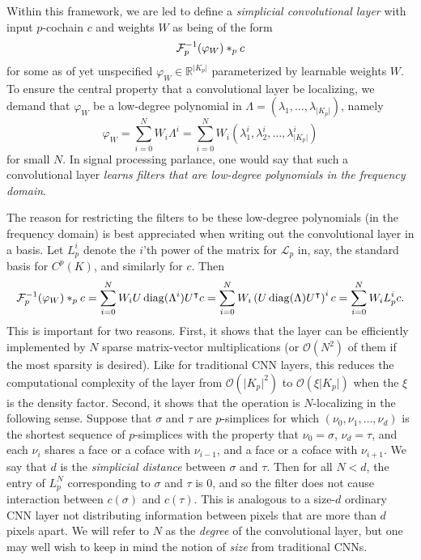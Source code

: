 Within this framework, we are led to define a \emph{simplicial convolutional layer} with input $p$-cochain $c$ and weights $W$ as being of the form
\begin{equation*}
  \mathcal{F}^{-1}_p(\varphi_W)\ast_p c  
\end{equation*}
for some as of yet unspecified $\varphi_W\in\mathbb{R}^{\lvert K_p \rvert}$ parameterized by learnable weights $W$. To ensure the central property that a convolutional layer be localizing, we demand that $\varphi_W$ be a low-degree polynomial in $\Lambda=(\lambda_1, \dotsc, \lambda_{\lvert K_p \rvert})$, namely
\begin{equation*}
  \varphi_W = \sum_{i=0}^N W_i\Lambda^i = \sum_{i=0}^N W_i(\lambda^i_1, \lambda^i_2, \dotsc, \lambda^i_{\lvert K_p \rvert})
\end{equation*}
for small $N$. In signal processing parlance, one would say that such a convolutional layer \emph{learns filters that are low-degree polynomials in the frequency domain}.

The reason for restricting the filters to be these low-degree polynomials (in the frequency domain) is best appreciated when writing out the convolutional layer in a basis. Let $L^i_p$ denote the $i$'th power of the matrix for $\mathcal{L}_p$ in, say, the standard basis for $C^p(K)$, and similarly for $c$. Then
\begin{equation}
  \mathcal{F}^{-1}_p(\varphi_W)\ast_p c = \sum_{i=0}^N W_iU\operatorname{diag}(\Lambda^i)U^{\intercal} c = \sum_{i=0}^N W_i\left(U\operatorname{diag}(\Lambda)U^{\intercal}\right)^i c = \sum_{i=0}^NW_iL^i_pc. \label{eq:filter}
\end{equation}
This is important for two reasons. First, it shows that the layer can be efficiently implemented by $N$ sparse matrix-vector multiplications (or $\mathcal{O}(N^2)$ of them if the most sparsity is desired). Like for traditional CNN layers, this reduces the computational complexity of the layer from $\mathcal{O}(\lvert K_p\rvert^2)$ to $\mathcal{O}(\xi\lvert K_p\rvert)$ when the $\xi$ is the density factor. Second, it shows that the operation is $N$-localizing in the following sense. Suppose that $\sigma$ and $\tau$ are $p$-simplices for which $(\nu_0, \nu_1, \dotsc, \nu_d)$ is the shortest sequence of $p$-simplices with the property that $\nu_0=\sigma$, $\nu_d=\tau$, and each $\nu_i$ shares a face or a coface with $\nu_{i-1}$, and a face or a coface with $\nu_{i+1}$. We say that $d$ is the \emph{simplicial distance} between $\sigma$ and $\tau$. Then for all $N<d$, the entry of $L_p^N$ corresponding to $\sigma$ and $\tau$ is $0$, and so the filter does not cause interaction between $c(\sigma)$ and $c(\tau)$. This is analogous to a size-$d$ ordinary CNN layer not distributing information between pixels that are more than $d$ pixels apart. We will refer to $N$ as the \emph{degree} of the convolutional layer, but one may well wish to keep in mind the notion of \emph{size} from traditional CNNs.

